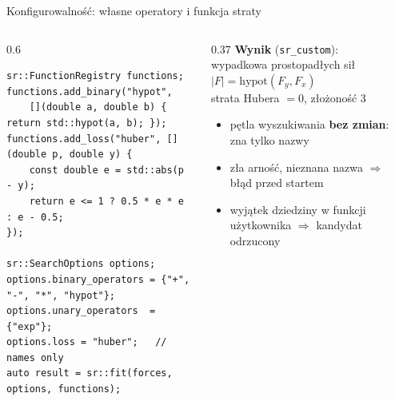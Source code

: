 \documentclass[aspectratio=169,11pt]{beamer}
\begin{document}
\begin{frame}[fragile]{Konfigurowalność: własne operatory i funkcja straty}
  \begin{columns}[c]
    \begin{column}{0.6\textwidth}
\begin{lstlisting}[basicstyle=\ttfamily\scriptsize]
sr::FunctionRegistry functions;
functions.add_binary("hypot",
    [](double a, double b) { return std::hypot(a, b); });
functions.add_loss("huber", [](double p, double y) {
    const double e = std::abs(p - y);
    return e <= 1 ? 0.5 * e * e : e - 0.5;
});

sr::SearchOptions options;
options.binary_operators = {"+", "-", "*", "hypot"};
options.unary_operators  = {"exp"};
options.loss = "huber";   // names only
auto result = sr::fit(forces, options, functions);
\end{lstlisting}
    \end{column}
    \begin{column}{0.37\textwidth}
      \textbf{Wynik} (\texttt{sr\_custom}):\\[3pt]
      wypadkowa prostopadłych sił\\[2pt]
      \hspace*{1em}$|F| = \mathrm{hypot}(F_y, F_x)$\\[2pt]
      strata Hubera $= 0$, złożoność 3
      \medskip
      \begin{itemize}\small
        \item pętla wyszukiwania \textbf{bez zmian}: zna tylko nazwy
        \item zła arność, nieznana nazwa $\Rightarrow$ błąd przed startem
        \item wyjątek dziedziny w funkcji użytkownika $\Rightarrow$ kandydat odrzucony
      \end{itemize}
    \end{column}
  \end{columns}
\end{frame}
\end{document}
